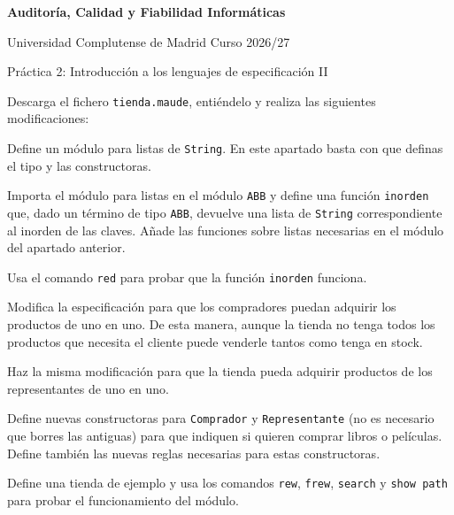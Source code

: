 

\usepackage{pgf}
\usepackage{tikz}
\usepackage{pstricks,pst-node,pst-tree,pstricks-add}



\begin{center}
{\Large\textbf{Auditor\'ia, Calidad y Fiabilidad Inform\'aticas}}
\smallskip

\large
Universidad Complutense de Madrid \qquad Curso 2026/27
\medskip

Pr\'actica 2: Introducci\'on a los lenguajes de especificaci\'on II\hfill\mbox{}

\noindent\hrulefill
\end{center}

Descarga el fichero \verb"tienda.maude", enti\'endelo y realiza las siguientes modificaciones:

\begin{listaejercicios}

\item
Define un m\'odulo para listas de \texttt{String}. En este apartado basta con que definas el tipo y
las constructoras.

\item
Importa el m\'odulo para listas en el m\'odulo \verb"ABB" y define una funci\'on \verb"inorden"
que, dado un t\'ermino de tipo \verb"ABB", devuelve una lista de \texttt{String} correspondiente al
inorden de las claves. A\~nade las funciones sobre listas necesarias en el m\'odulo del apartado anterior.

\item
Usa el comando \verb"red" para probar que la funci\'on \verb"inorden" funciona.

\item
Modifica la especificaci\'on para que los compradores puedan adquirir los productos de uno en uno. De esta manera,
aunque la tienda no tenga todos los productos que necesita el cliente puede venderle tantos como tenga en stock.

\item
Haz la misma modificaci\'on para que la tienda pueda adquirir productos de los representantes de uno en uno.

\item
Define nuevas constructoras para \verb"Comprador" y \verb"Representante" (no es necesario que borres
las antiguas) para que indiquen si quieren comprar libros o pel\'iculas. Define tambi\'en las nuevas
reglas necesarias para estas constructoras.

\item
Define una tienda de ejemplo y usa los comandos \verb"rew", \verb"frew", \verb"search" y \verb"show path"
para probar el funcionamiento del m\'odulo.

\end{listaejercicios}


